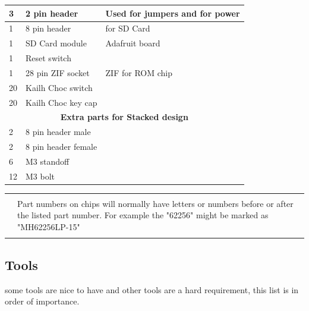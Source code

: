 \documentclass{ol-softwaremanual}
\newcommand{\Note}[1]{
\begin{table}[h]
\begin{tabular}{|p{0.1\textwidth}p{0.8\textwidth}|}
\hline
 & \\
\multicolumn{1}{|r}{\Huge\warning} & #1\\
 &  \\ \hline
\end{tabular}
\end{table}
}
\begin{document}
\begin{ffcode}
\begin{table}[H]
\begin{adjustbox}{width=0.9\textwidth,center=1\textwidth}
\begin{tabular}{|lll|}
\multicolumn{1}{|l|}{3}&\multicolumn{1}{l|}{2 pin header}&\multicolumn{1}{l|}{Used for jumpers and for power}\\ \hline

\multicolumn{1}{|l|}{1}&\multicolumn{1}{l|}{8 pin header}&\multicolumn{1}{l|}{for SD Card}\\ \hline

\multicolumn{1}{|l|}{1}&\multicolumn{1}{l|}{SD Card module}&\multicolumn{1}{l|}{Adafruit board}\\ \hline

\multicolumn{1}{|l|}{1}&\multicolumn{1}{l|}{Reset switch}&\multicolumn{1}{l|}{}\\ \hline

\multicolumn{1}{|l|}{1}&\multicolumn{1}{l|}{28 pin ZIF socket}&\multicolumn{1}{l|}{ZIF for ROM chip}\\ \hline

\multicolumn{1}{|l|}{20}&\multicolumn{1}{l|}{Kailh Choc switch}&\multicolumn{1}{l|}{}\\ \hline

\multicolumn{1}{|l|}{20}&\multicolumn{1}{l|}{Kailh Choc key cap}&\multicolumn{1}{l|}{}\\ \hline

\multicolumn{3}{|c|}{\textbf{Extra parts for Stacked design}}\\ \hline

\multicolumn{1}{|l|}{2}&\multicolumn{1}{l|}{8 pin header male}&\multicolumn{1}{l|}{}\\ \hline

\multicolumn{1}{|l|}{2}&\multicolumn{1}{l|}{8 pin header female}&\multicolumn{1}{l|}{}\\ \hline

\multicolumn{1}{|l|}{6}&\multicolumn{1}{l|}{M3 standoff}&\multicolumn{1}{l|}{}\\ \hline

\multicolumn{1}{|l|}{12}&\multicolumn{1}{l|}{M3 bolt}&\multicolumn{1}{l|}{}\\ \hline

\end{tabular}
\end{adjustbox}
\end{table}
\Note{Part numbers on chips will normally have letters or numbers before or after the listed part number. For example the "62256" might be marked as "MH62256LP-15"}
\clearpage

\subsection{Tools}
some tools are nice to have and other tools are a hard requirement, this list is in order of importance.


\end{ffcode}
\end{document}
